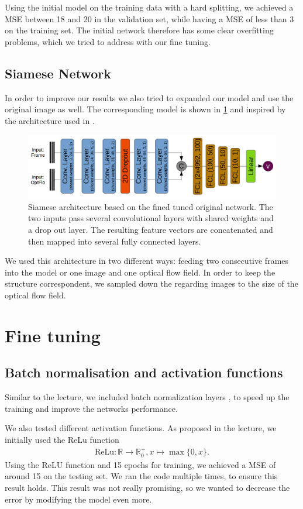 \documentclass[conference]{IEEEtran}
\begin{document}
Using the initial model on the training data with a hard splitting, we achieved a MSE between 18 and 20 
in the validation set, while having a MSE of less than 3 on the training set. The initial network 
therefore has some clear overfitting problems, which we tried to address with our fine tuning.

\subsection{Siamese Network}
\label{subsec:SiameseNetork}
In order to improve our results we also tried to expanded our model and use the original image as well. The corresponding model is shown in \cref{fig:siameseNetwork} and inspired by the architecture used in
\cite{Wang2017}.

\begin{figure}[ht]
	\centering
	\includegraphics[width=0.9\columnwidth]{imgs/siamese_model.png}
	\caption{Siamese architecture based on the fined tuned original network. The two inputs pass 
	several convolutional layers with shared weights and a drop out layer. The resulting
	feature vectors are concatenated and then mapped into several fully connected layers.}
	\label{fig:siameseNetwork}
\end{figure}
We used this architecture in two different ways: feeding two consecutive frames into the model or one image and one optical flow field. In order to keep the structure correspondent, we sampled down the regarding images to the size of the optical flow field.

\section{Fine tuning}

\subsection{Batch normalisation and activation functions}
Similar to the lecture, we included batch normalization layers \cite{BatchNorm2015}, to speed up
the training and improve the networks performance.

We also tested different activation functions. As proposed in the lecture, we initially used the ReLu
function
\begin{align*}
\mathrm{ReLu}: \mathbb{R} \to \mathbb{R}_0^+, x \mapsto \max\{0,x\}.
\end{align*}
Using the ReLU function and 15 epochs for training, we achieved a MSE of around 15 on the 
testing set. We ran the code multiple times, to ensure this result holds. This result was not really 
promising, so we wanted to decrease the error by modifying the model even more.
\end{document}
